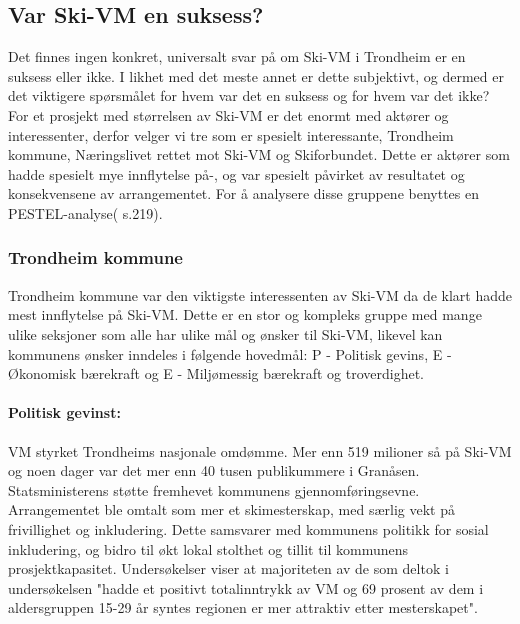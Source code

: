 \subsection{Var Ski-VM en suksess?}
Det finnes ingen konkret, universalt svar på om Ski-VM i Trondheim er en suksess eller ikke.  
I likhet med det meste annet er dette subjektivt, og dermed er det viktigere spørsmålet for hvem 
var det en suksess og for hvem var det ikke? For et prosjekt med størrelsen av Ski-VM er det 
enormt med aktører og interessenter, derfor velger vi tre som er spesielt interessante, 
Trondheim kommune, Næringslivet rettet mot Ski-VM og Skiforbundet. Dette er aktører som hadde 
spesielt mye innflytelse på-, og var spesielt påvirket av resultatet og konsekvensene av 
arrangementet. For å analysere disse gruppene benyttes en PESTEL-analyse(\cite{Teknologiledelse} s.219).

\subsubsection{Trondheim kommune}
Trondheim kommune var den viktigste interessenten av Ski-VM da de klart hadde mest 
innflytelse på Ski-VM. Dette er en stor og kompleks gruppe med mange ulike seksjoner som 
alle har ulike mål og ønsker til Ski-VM, likevel kan kommunens ønsker inndeles i 
følgende hovedmål: P - Politisk gevins, E - Økonomisk bærekraft og E - Miljømessig bærekraft og troverdighet.


\paragraph{Politisk gevinst:} VM styrket Trondheims nasjonale omdømme. Mer enn 519 milioner så på 
Ski-VM\cite{AftenpostenSeertall} og noen dager var det mer enn 40 tusen publikummere i 
Granåsen\cite{NRKFolkefest}. Statsministerens støtte fremhevet kommunens 
gjennomføringsevne\cite{Trondheim2025Midler}. 
Arrangementet ble omtalt som mer et skimesterskap, med særlig vekt på frivillighet og 
inkludering\cite{Trondheim2025Baerekraft}.  Dette samsvarer med kommunens politikk for sosial inkludering, 
og bidro til økt lokal stolthet og tillit til kommunens prosjektkapasitet. Undersøkelser viser
at majoriteten av de som deltok i undersøkelsen "hadde et positivt totalinntrykk av VM og 69 prosent 
av dem i aldersgruppen 15-29 år syntes regionen er mer attraktiv etter mesterskapet"\cite{AftenpostenNyVM}.

